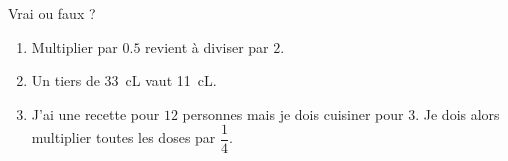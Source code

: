 
\begin{exercice}\label{exosmath-0880}

    Vrai ou faux ?
    \begin{enumerate}
        \item
            Multiplier par \( 0.5\) revient à diviser par \( 2\).
        \item
            Un tiers de \SI{33}{\centi\liter} vaut \SI{11}{\centi\liter}.
        \item
            J'ai une recette pour \( 12\) personnes mais je dois cuisiner pour \( 3\). Je dois alors multiplier toutes les doses par \( \dfrac{ 1 }{ 4 }\).
    \end{enumerate}

\end{exercice}
